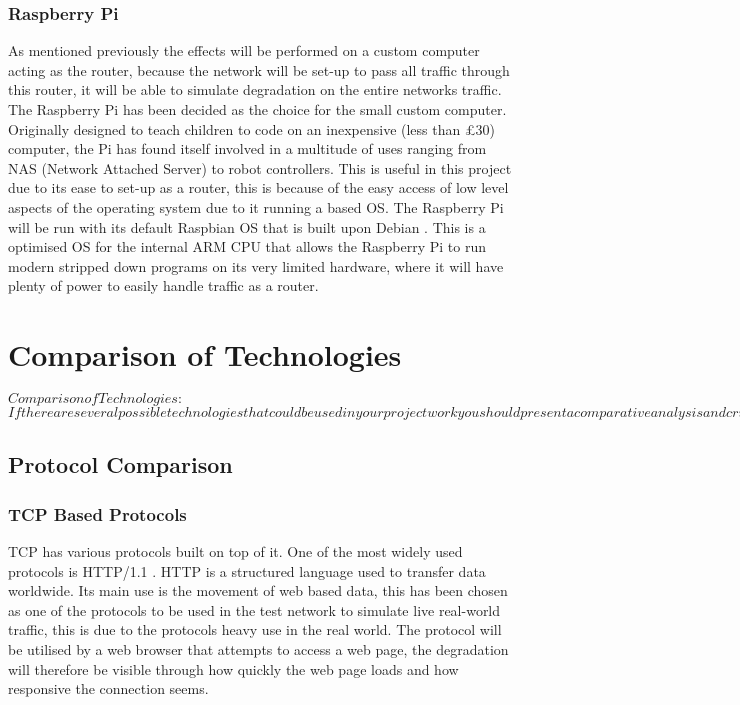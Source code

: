 \subsubsection{Raspberry Pi}
As mentioned previously the effects will be performed on a custom computer acting as the router, because the network will be set-up to pass all traffic through this router, it will be able to simulate degradation on the entire networks traffic.
The Raspberry Pi \citep{upton2014raspberry} has been decided as the choice for the small custom computer. Originally designed to teach children to code on an inexpensive (less than £30) computer, the Pi has found itself involved in a multitude of uses ranging from NAS (Network Attached Server) to robot controllers. This is useful in this project due to its ease to set-up as a router, this is because of the easy access of low level aspects of the operating system due to it running a based OS. The Raspberry Pi will be run with its default Raspbian OS \citep{pi2014raspbian} that is built upon Debian \citep{murdock1994overview}. This is a optimised OS for the internal ARM CPU that allows the Raspberry Pi to run modern stripped down programs on its very limited hardware, where it will have plenty of power to easily handle traffic as a router.

\section{Comparison of Technologies}
$Comparison of Technologies:$
$If there are several possible technologies that could be used in your project work you should present a comparative analysis and critical appraisal of each of these technologies. You should create a subsection for each of the technologies you discuss and title each subsection with the name of the technology it describes (e.g. object-oriented databases, XML ). Within each subsection you should provide an overview of the technology, its key features and its strengths and weaknesses in relation to your project.$

\subsection{Protocol Comparison}
\subsubsection{TCP Based Protocols}
TCP has various protocols built on top of it. One of the most widely used protocols is HTTP/1.1 \citep{HTTP}. HTTP is a structured language used to transfer data worldwide. Its main use is the movement of web based data, this has been chosen as one of the protocols to be used in the test network to simulate live real-world traffic, this is due to the protocols heavy use in the real world. The protocol will be utilised by a web browser that attempts to access a web page, the degradation will therefore be visible through how quickly the web page loads and how responsive the connection seems.

